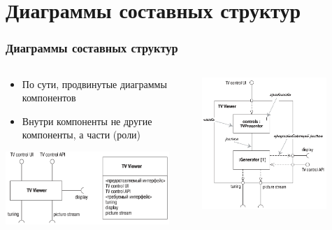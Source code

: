 \documentclass{../mcsslides}
\begin{document}
    \section{Диаграммы составных структур}

    \begin{frame}
        \frametitle{Диаграммы составных структур}
        \begin{columns}
            \begin{column}{0.5\textwidth}
                \begin{itemize}
                    \item По сути, продвинутые диаграммы компонентов
                    \item Внутри компоненты не другие компоненты, а части (роли)
                \end{itemize}
                \vspace{3mm}
                \begin{center}
                    \includegraphics[width=0.9\textwidth]{compositeStructureElement.png}
                \end{center}
            \end{column}
            \begin{column}{0.5\textwidth}
                \begin{center}
                    \includegraphics[width=0.8\textwidth]{compositeStructureDiagram.png}
                \end{center}
            \end{column}
        \end{columns}
    \end{frame}
\end{document}
